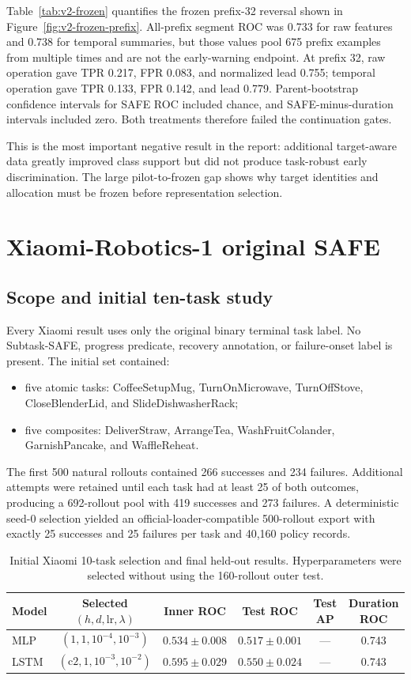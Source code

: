 \documentclass[11pt,a4paper]{article}
\begin{document}
Table~\ref{tab:v2-frozen} quantifies the frozen prefix-32 reversal shown in
Figure~\ref{fig:v2-frozen-prefix}. All-prefix segment ROC was 0.733 for raw
features and 0.738 for temporal summaries, but those values pool 675 prefix
examples from multiple times and are not the early-warning endpoint. At prefix
32, raw operation gave TPR 0.217, FPR 0.083, and normalized lead 0.755;
temporal operation gave TPR 0.133, FPR 0.142, and lead 0.779.
Parent-bootstrap confidence intervals for SAFE ROC included chance, and
SAFE-minus-duration intervals included zero. Both treatments therefore failed
the continuation gates.

This is the most important negative result in the report: additional target-aware data greatly improved class support but did not produce task-robust early discrimination. The large pilot-to-frozen gap shows why target identities and allocation must be frozen before representation selection.

\section{Xiaomi-Robotics-1 original SAFE}

\subsection{Scope and initial ten-task study}
Every Xiaomi result uses only the original binary terminal task label. No
Subtask-SAFE, progress predicate, recovery annotation, or failure-onset label
is present. The initial set contained:
\begin{itemize}
\item five atomic tasks: CoffeeSetupMug, TurnOnMicrowave, TurnOffStove,
CloseBlenderLid, and SlideDishwasherRack;
\item five composites: DeliverStraw, ArrangeTea, WashFruitColander,
GarnishPancake, and WaffleReheat.
\end{itemize}

The first 500 natural rollouts contained 266 successes and 234 failures.
Additional attempts were retained until each task had at least 25 of both
outcomes, producing a 692-rollout pool with 419 successes and 273 failures.
A deterministic seed-0 selection yielded an official-loader-compatible
500-rollout export with exactly 25 successes and 25 failures per task and
40,160 policy records.

\begin{table}[H]
\centering
\caption{Initial Xiaomi 10-task selection and final held-out results. Hyperparameters were selected without using the 160-rollout outer test.}
\label{tab:xr1-initial-ten-task}
\begin{tabular}{lccccc}
\toprule
Model & Selected $(h,d,\mathrm{lr},\lambda)$ & Inner ROC & Test ROC & Test AP & Duration ROC\\
\midrule
MLP & $(1,1,10^{-4},10^{-3})$ & $0.534\pm0.008$ & $0.517\pm0.001$ & --- & 0.743\\
LSTM & $(\mathrm{c2},1,10^{-3},10^{-2})$ & $0.595\pm0.029$ & $0.550\pm0.024$ & --- & 0.743\\
\bottomrule
\end{tabular}
\end{table}
\end{document}

